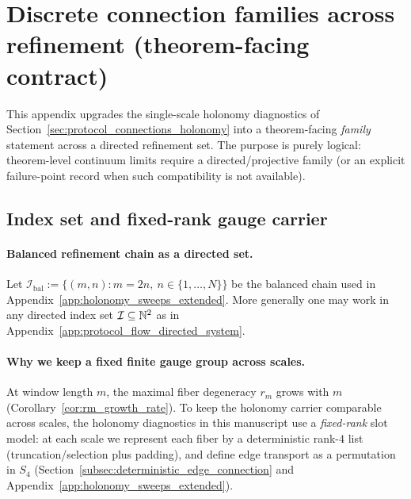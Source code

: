 \section{Discrete connection families across refinement (theorem-facing contract)}
\label{app:discrete_connection_family_and_refinement}

This appendix upgrades the single-scale holonomy diagnostics of Section~\ref{sec:protocol_connections_holonomy} into a theorem-facing \emph{family} statement across a directed refinement set.
The purpose is purely logical: theorem-level continuum limits require a directed/projective family (or an explicit failure-point record when such compatibility is not available).

\begin{center}
\end{center}

\subsection{Index set and fixed-rank gauge carrier}
\paragraph{Balanced refinement chain as a directed set.}
\MathTag Let $\mathcal{I}_{\mathrm{bal}}:=\{(m,n): m=2n,\ n\in\{1,\dots,N\}\}$ be the balanced chain used in Appendix~\ref{app:holonomy_sweeps_extended}.
More generally one may work in any directed index set $\mathcal{I}\subseteq\mathbb{N}^2$ as in Appendix~\ref{app:protocol_flow_directed_system}.

\paragraph{Why we keep a fixed finite gauge group across scales.}
\MathTag At window length $m$, the maximal fiber degeneracy $r_m$ grows with $m$ (Corollary~\ref{cor:rm_growth_rate}).
To keep the holonomy carrier comparable across scales, the holonomy diagnostics in this manuscript use a \emph{fixed-rank} slot model: at each scale we represent each fiber by a deterministic rank-$4$ list (truncation/selection plus padding), and define edge transport as a permutation in $S_4$ (Section~\ref{subsec:deterministic_edge_connection} and Appendix~\ref{app:holonomy_sweeps_extended}).

